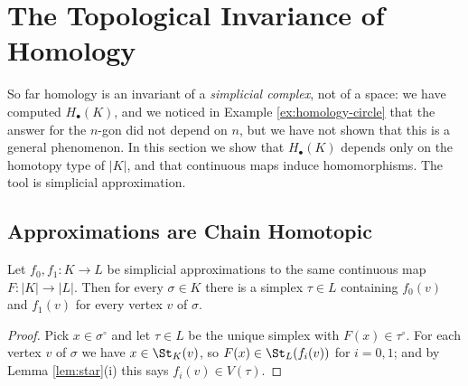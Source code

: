 \section{The Topological Invariance of Homology}

So far homology is an invariant of a \emph{simplicial complex}, not of a space: we have
computed $H_\bullet(K)$, and we noticed in Example \ref{ex:homology-circle} that the
answer for the $n$-gon did not depend on $n$, but we have not shown that this is a
general phenomenon. In this section we show that $H_\bullet(K)$ depends only on the
homotopy type of $|K|$, and that continuous maps induce homomorphisms. The tool is
simplicial approximation.

\subsection{Approximations are Chain Homotopic}

\begin{lemma} \label{lem:two-approximations}
	Let $f_0, f_1: K \to L$ be simplicial approximations to the same continuous map $F: |K|\to|L|$. Then for every $\sigma \in K$ there is a simplex $\tau \in L$ containing $f_0(v)$ and $f_1(v)$ for every vertex $v$ of $\sigma$.
\end{lemma}
\begin{proof}
	Pick $x \in \sigma^\circ$ and let $\tau \in L$ be the unique simplex with $F(x)\in\tau^\circ$. For each vertex $v$ of $\sigma$ we have $x \in \St_K(v)$, so $F(x) \in \St_L(f_i(v))$ for $i = 0,1$; and by Lemma \ref{lem:star}(i) this says $f_i(v) \in V(\tau)$.
\end{proof}

